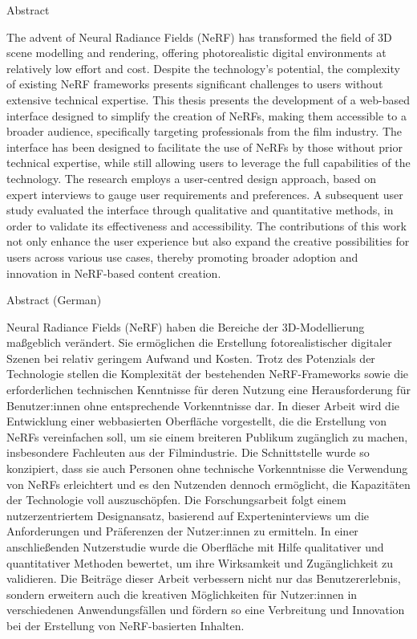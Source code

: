 %

{Abstract}\label{sec:abstract} \\
\vspace*{-2mm}

The advent of Neural Radiance Fields (NeRF) has transformed the field of 3D scene modelling and rendering, offering photorealistic digital environments at relatively low effort and cost.
Despite the technology's potential, the complexity of existing NeRF frameworks presents significant challenges to users without extensive technical expertise.
This thesis presents the development of a web-based interface designed to simplify the creation of NeRFs, making them accessible to a broader audience, specifically targeting professionals from the film industry.
The interface has been designed to facilitate the use of NeRFs by those without prior technical expertise, while still allowing users to leverage the full capabilities of the technology.
The research employs a user-centred design approach, based on expert interviews to gauge user requirements and preferences.
A subsequent user study evaluated the interface through qualitative and quantitative methods, in order to validate its effectiveness and accessibility.
The contributions of this work not only enhance the user experience but also expand the creative possibilities for users across various use cases, thereby promoting broader adoption and innovation in NeRF-based content creation.

\vspace*{10mm}

{Abstract (German)}\label{sec:abstract-diff} \\
\vspace*{-2mm}

Neural Radiance Fields (NeRF) haben die Bereiche der 3D-Modellierung ma{\ss}geblich verändert.
Sie ermöglichen die Erstellung fotorealistischer digitaler Szenen bei relativ geringem Aufwand und Kosten.
Trotz des Potenzials der Technologie stellen die Komplexität der bestehenden NeRF-Frameworks sowie die erforderlichen technischen Kenntnisse für deren Nutzung eine Herausforderung für Benutzer:innen ohne entsprechende Vorkenntnisse dar.
In dieser Arbeit wird die Entwicklung einer webbasierten Oberfläche vorgestellt, die die Erstellung von NeRFs vereinfachen soll, um sie einem breiteren Publikum zugänglich zu machen, insbesondere Fachleuten aus der Filmindustrie.
Die Schnittstelle wurde so konzipiert, dass sie auch Personen ohne technische Vorkenntnisse die Verwendung von NeRFs erleichtert und es den Nutzenden dennoch ermöglicht, die Kapazitäten der Technologie voll auszuschöpfen.
Die Forschungsarbeit folgt einem nutzerzentriertem Designansatz, basierend auf Experteninterviews um die Anforderungen und Präferenzen der Nutzer:innen zu ermitteln.
In einer anschlie{\ss}enden Nutzerstudie wurde die Oberfläche mit Hilfe qualitativer und quantitativer Methoden bewertet, um ihre Wirksamkeit und Zugänglichkeit zu validieren.
Die Beiträge dieser Arbeit verbessern nicht nur das Benutzererlebnis, sondern erweitern auch die kreativen Möglichkeiten für Nutzer:innen in verschiedenen Anwendungsfällen und fördern so eine Verbreitung und Innovation bei der Erstellung von NeRF-basierten Inhalten.